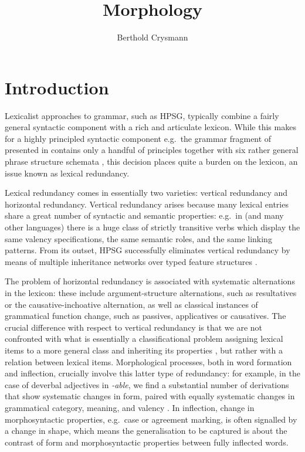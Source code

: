 \documentclass[output=paper
 	        ,biblatex
                ,babelshorthands
                ,newtxmath
                ,draftmode
                ,colorlinks, citecolor=brown
]{langscibook}
\author{Berthold Crysmann\affiliation{CNRS}
}
\title{Morphology}
\begin{document}
\maketitle

\label{chap-morphology}




\section{Introduction}
\label{morphology-sec:Intro}

Lexicalist approaches to grammar, such as HPSG, typically combine a
fairly general syntactic component with a rich and articulate
lexicon. While this makes for a highly principled syntactic
component \emdash e.g.\ the grammar fragment of  presented in
\citet{Pollard94} contains only a handful of principles together with
six rather general phrase structure schemata \emdash, this decision places
quite a burden on the lexicon, an issue  known as lexical
redundancy.

Lexical redundancy comes in essentially two varieties: vertical redundancy
and horizontal redundancy. Vertical redundancy arises because many
lexical entries share a great number of syntactic and semantic
properties: e.g.\ in  (and many other languages) there is a huge
class of strictly transitive verbs which display the same valency
specifications, the same semantic roles, and the same linking
patterns. From its outset, HPSG successfully eliminates vertical
redundancy by means of multiple inheritance networks over typed
feature structures \citep{Flickinger:Pollard:ea:85a}.

The problem of horizontal redundancy is associated with systematic
alternations in the lexicon: these include argument-structure
alternations, such as resultatives or the causative-inchoative
alternation, as well as classical instances of grammatical function
change, such as passives, applicatives or causatives. The crucial
difference with respect to vertical redundancy is that we are not
confronted with what is essentially a classificational problem \emdash
assigning lexical items to a more general class and inheriting its
properties \emdash, but rather with a relation between lexical items.
Morphological processes, both in word formation and inflection,
crucially involve this latter type of redundancy: for example, in the
case of deverbal adjectives in \textit{-able}, we find a substantial
number of derivations that show systematic changes in form, paired
with equally systematic changes in grammatical category, meaning, and
valency \citep{Riehemann98}. In inflection, change in morphosyntactic
properties, e.g.\ case or agreement marking, is often signalled by a
change in shape, which means the generalisation to be captured is about the
contrast of form and morphosyntactic properties between fully
inflected words.
\end{document}
